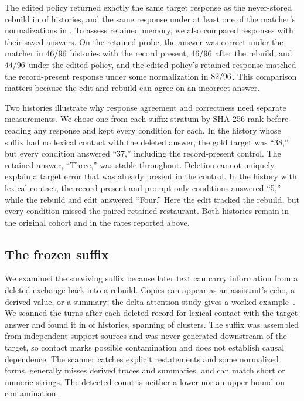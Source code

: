 The edited policy returned exactly the same target response as the
never-stored rebuild in \LMChatVThreeTargetPolicyRebuildExactN{} of
\LMChatVThreeN{} histories, and the same response under at least one of the
matcher's normalizations in \LMChatVThreeTargetPolicyRebuildNormalizedN{}.
To assess retained memory, we also compared responses with their saved
answers. On the retained probe, the answer was correct under the matcher in
\(46/96\) histories with the
record present, \(46/96\) after
the rebuild, and \(44/96\) under
the edited policy, and the edited policy's retained response matched the
record-present response under some normalization in
\(82/96\). This comparison matters because the edit and rebuild can agree on an
incorrect answer.

Two histories illustrate why response agreement and correctness need
separate measurements. We chose one from each suffix stratum by SHA-256 rank
before reading any response and kept every condition for each. In the history
whose suffix had no lexical contact with the deleted answer, the gold target
was ``38,'' but every condition answered ``37,'' including the record-present
control. The retained answer, ``Three,'' was stable throughout. Deletion
cannot uniquely explain a target error that was already present in the
control. In the history with lexical contact, the record-present and
prompt-only conditions answered ``5,'' while the rebuild and edit answered
``Four.'' Here the edit tracked the rebuild, but every condition missed the
paired retained restaurant. Both histories remain in the original cohort
and in the rates reported above.

\subsection{The frozen suffix}\label{app:longmemeval-suffix}

We examined the surviving suffix because later text can carry information
from a deleted exchange back into a rebuild. Copies can appear as an
assistant's echo, a derived value, or a summary; the delta-attention study
gives a worked example~\citep{kdaomission}. We scanned the turns after each
deleted record for lexical contact with the target answer and found it in
\LMChatVThreeSuffixContaminatedHistoryN{} of \LMChatVThreeN{} histories,
spanning \LMChatVThreeSuffixContaminatedClusterN{} of \LMChatVThreeK{}
clusters. The suffix was assembled from independent support sources and was
never generated downstream of the target, so contact marks possible
contamination and does not establish causal dependence. The scanner catches
explicit restatements and some normalized forms, generally misses derived
traces and summaries, and can match short or numeric strings. The detected count is neither a lower
nor an upper bound on contamination.

